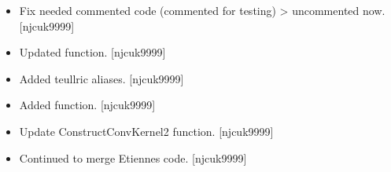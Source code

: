 \documentclass[a4paper,10pt,english]{report}
\begin{document}
\begin{itemize}
\item {} 
Fix needed commented code (commented for testing) \textendash{}\textgreater{} uncommented now.
{[}njcuk9999{]}

\item {} 
Updated  function. {[}njcuk9999{]}

\item {} 
Added teullric aliases. {[}njcuk9999{]}

\item {} 
Added  function. {[}njcuk9999{]}

\item {} 
Update ConstructConvKernel2 function. {[}njcuk9999{]}

\item {} 
Continued to merge Etiennes code. {[}njcuk9999{]}

\end{itemize}
\end{document}
